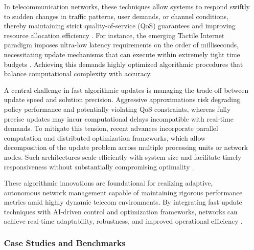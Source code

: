 \documentclass[sigconf]{acmart}
\begin{document}
In telecommunication networks, these techniques allow systems to respond swiftly to sudden changes in traffic patterns, user demands, or channel conditions, thereby maintaining strict quality-of-service (QoS) guarantees and improving resource allocation efficiency \cite{ref10}. For instance, the emerging Tactile Internet paradigm imposes ultra-low latency requirements on the order of milliseconds, necessitating update mechanisms that can execute within extremely tight time budgets \cite{ref10}. Achieving this demands highly optimized algorithmic procedures that balance computational complexity with accuracy.

A central challenge in fast algorithmic updates is managing the trade-off between update speed and solution precision. Aggressive approximations risk degrading policy performance and potentially violating QoS constraints, whereas fully precise updates may incur computational delays incompatible with real-time demands. To mitigate this tension, recent advances incorporate parallel computation and distributed optimization frameworks, which allow decomposition of the update problem across multiple processing units or network nodes. Such architectures scale efficiently with system size and facilitate timely responsiveness without substantially compromising optimality \cite{ref11,ref6}.

These algorithmic innovations are foundational for realizing adaptive, autonomous network management capable of maintaining rigorous performance metrics amid highly dynamic telecom environments. By integrating fast update techniques with AI-driven control and optimization frameworks, networks can achieve real-time adaptability, robustness, and improved operational efficiency \cite{ref2,ref6,ref11}.

\subsubsection{Case Studies and Benchmarks}
\end{document}
